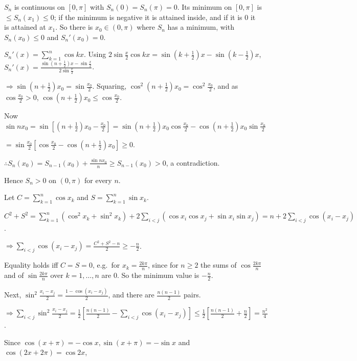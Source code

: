   $S_n$ is continuous on $[0, \pi]$ with $S_n(0) = S_n(\pi) = 0$. Its minimum on $[0, \pi]$ is $\leq S_n(x_1)\leq
  0$; if the minimum is negative it is attained inside, and if it is $0$ it is attained at $x_1$. So there is
  $x_0\in(0, \pi)$ where $S_n$ has a minimum, with $S_n(x_0)\leq 0$ and $S_n'(x_0) = 0$.

  $S_n'(x) = \displaystyle\sum_{k = 1}^n\cos kx$. Using $2\sin\frac{x}{2}\cos kx = \sin\left(k +
  \frac{1}{2}\right)x - \sin\left(k - \frac{1}{2}\right)x$, $S_n'(x) = \frac{\sin\left(n +
      \frac{1}{2}\right)x - \sin\frac{x}{2}}{2\sin\frac{x}{2}}$.

  $\Rightarrow\sin\left(n + \frac{1}{2}\right)x_0 = \sin\frac{x_0}{2}$. Squaring, $\cos^2\left(n +
  \frac{1}{2}\right)x_0 = \cos^2\frac{x_0}{2}$, and as $\cos\frac{x_0}{2} > 0$, $\cos\left(n +
  \frac{1}{2}\right)x_0\leq\cos\frac{x_0}{2}$.

  Now $\sin nx_0 = \sin\left[\left(n + \frac{1}{2}\right)x_0 - \frac{x_0}{2}\right] = \sin\left(n +
  \frac{1}{2}\right)x_0\cos\frac{x_0}{2} - \cos\left(n + \frac{1}{2}\right)x_0\sin\frac{x_0}{2}$

  $= \sin\frac{x_0}{2}\left[\cos\frac{x_0}{2} - \cos\left(n + \frac{1}{2}\right)x_0\right]\geq 0$.

  $\therefore S_n(x_0) = S_{n - 1}(x_0) + \frac{\sin nx_0}{n}\geq S_{n - 1}(x_0) > 0$, a contradiction.

  Hence $S_n > 0$ on $(0, \pi)$ for every $n$.
\item Let $C = \displaystyle\sum_{k = 1}^n\cos x_k$ and $S = \displaystyle\sum_{k = 1}^n\sin x_k$.

  $C^2 + S^2 = \displaystyle\sum_{k = 1}^n(\cos^2x_k + \sin^2x_k) + 2\sum_{i < j}(\cos x_i\cos x_j + \sin
  x_i\sin x_j) = n + 2\sum_{i < j}\cos(x_i - x_j)$.

  $\Rightarrow\displaystyle\sum_{i < j}\cos(x_i - x_j) = \frac{C^2 + S^2 - n}{2}\geq -\frac{n}{2}$.

  Equality holds iff $C = S = 0$, e.g.\ for $x_k = \frac{2k\pi}{n}$, since for $n\geq 2$ the sums of
  $\cos\frac{2k\pi}{n}$ and of $\sin\frac{2k\pi}{n}$ over $k = 1, \ldots, n$ are $0$. So the minimum value is
  $-\frac{n}{2}$.

  Next, $\sin^2\frac{x_i - x_j}{2} = \frac{1 - \cos(x_i - x_j)}{2}$, and there are $\frac{n(n - 1)}{2}$
  pairs.

  $\Rightarrow\displaystyle\sum_{i < j}\sin^2\frac{x_i - x_j}{2} = \frac{1}{2}\left[\frac{n(n - 1)}{2} -
  \sum_{i < j}\cos(x_i - x_j)\right]\leq\frac{1}{2}\left[\frac{n(n - 1)}{2} + \frac{n}{2}\right]
  = \frac{n^2}{4}$.
\item Since $\cos(x + \pi) = -\cos x, \sin(x + \pi) = -\sin x$ and $\cos(2x + 2\pi) = \cos2x$,

